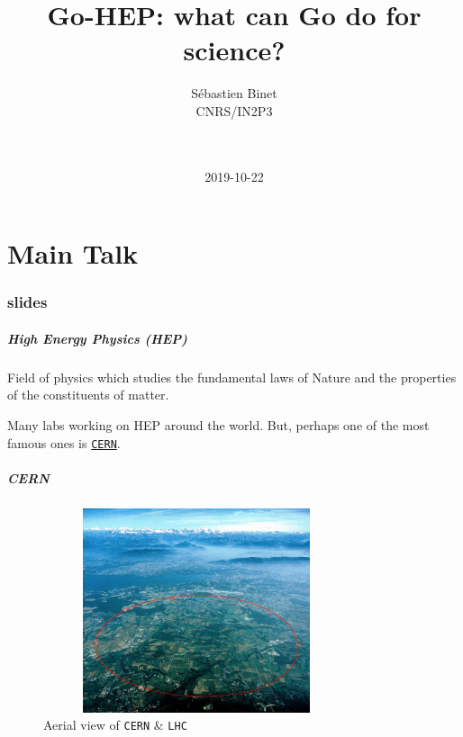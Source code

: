 \documentclass[9pt]{beamer}
\title[Go-HEP: what can Go do for science?]{Go-HEP: what can Go do for science?}
\date{2019-10-22}
\author[S\'ebastien Binet]{
 \parbox{0.26\textwidth}{
	\texorpdfstring
	  {
		\centering
 		S\'ebastien Binet \\
 		CNRS/IN2P3 \\
 		\myblue{\href{http://twitter.com/0xbins}{\texttt{@0xbins}}} \\
 		\myblue{\href{mailto:binet@cern.ch}{\texttt{binet@cern.ch}}} \\
 	  }
	{S\'ebastien Binet}
}
 }
\institute[GoLab-2019]{\insertlogo\hskip0.1cm}
\newcommand{\myblue} [1] {{\color{blue}#1}}
\begin{document}
\frame{\titlepage
}

\part<presentation>{Main Talk}

\section[slides]{slides}

\begin{frame}[fragile]
\frametitle{High Energy Physics (HEP)}


	\begin{exampleblock}{}
Field of physics which studies the fundamental laws of Nature and the
properties of the constituents of matter.
	\end{exampleblock}{}


Many labs working on HEP around the world. 
But, perhaps one of the most famous ones is \myblue{\href{http://cern.ch}{\texttt{CERN}}}.



\end{frame}

\begin{frame}[fragile]
\frametitle{CERN}


\begin{figure}[h]
\begin{center}
\includegraphics[width=9cm,height=6cm]{_figs/cernaerial.jpg}
\end{center}
	\caption{Aerial view of \texttt{CERN} \& \texttt{LHC}}

\end{figure}


\end{frame}
\end{document}
